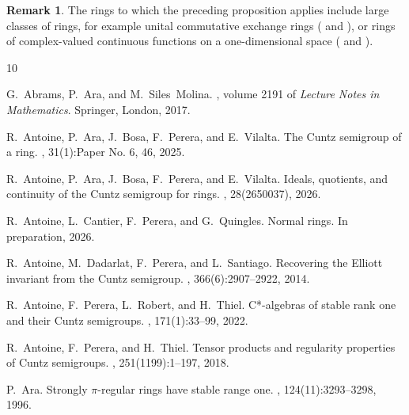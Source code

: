 \documentclass[11pt]{amsart}
\numberwithin{equation}{section}
\theoremstyle{definition}
\newtheorem{rmk}[rmkCt]{Remark}
\theoremstyle{plain}
\theoremstyle{definition}
\begin{document}
\begin{rmk}
The rings to which the preceding proposition applies include large classes of rings, for example unital commutative exchange rings (\cite{ACPQ} and \cite[Theorem 6]{Yu1995}), or rings of complex-valued continuous functions on a one-dimensional space (\cite[Lemma 7.4]{AntAraBosPerVil26} and \cite{vaserstein1971}). 
\end{rmk}
%
%
%

\begin{thebibliography}{10}
	
	G.~Abrams, P.~Ara, and M.~Siles~Molina.
	, volume 2191 of {\em Lecture Notes in
		Mathematics}.
	\newblock Springer, London, 2017.
	
	R.~Antoine, P.~Ara, J.~Bosa, F.~Perera, and E.~Vilalta.
	\newblock The {C}untz semigroup of a ring.
	, 31(1):Paper No. 6, 46, 2025.
	
	R.~Antoine, P.~Ara, J.~Bosa, F.~Perera, and E.~Vilalta.
	\newblock Ideals, quotients, and continuity of the {C}untz semigroup for rings.
	, 28(2650037), 2026.
	
	R.~Antoine, L.~Cantier, F.~Perera, and G.~Quingles.
	\newblock Normal rings.
	\newblock In preparation, 2026.
	
	R.~Antoine, M.~Dadarlat, F.~Perera, and L.~Santiago.
	\newblock Recovering the {E}lliott invariant from the {C}untz semigroup.
	, 366(6):2907--2922, 2014.
	
	R.~Antoine, F.~Perera, L.~Robert, and H.~Thiel.
	\newblock C*-algebras of stable rank one and their {C}untz semigroups.
	, 171(1):33--99, 2022.
	
	R.~Antoine, F.~Perera, and H.~Thiel.
	\newblock Tensor products and regularity properties of {C}untz semigroups.
	, 251(1199):1--197, 2018.
	
	P.~Ara.
	\newblock Strongly {$\pi$}-regular rings have stable range one.
	, 124(11):3293--3298, 1996.
	

\end{thebibliography}
\end{document}
